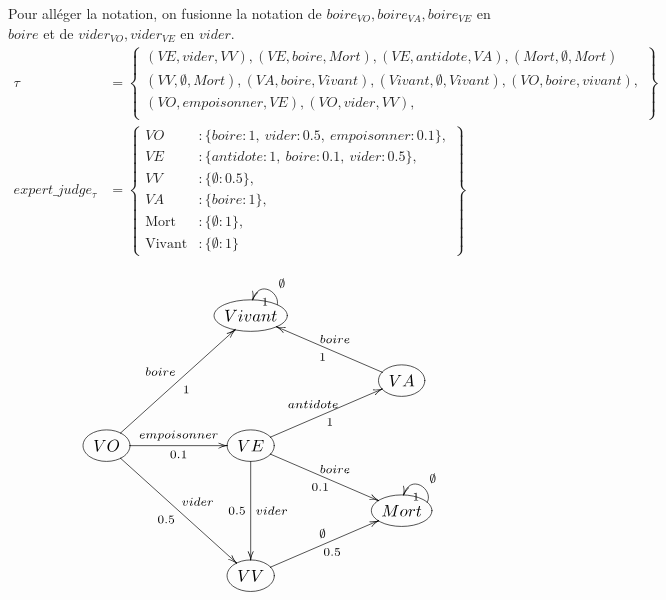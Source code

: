 Pour alléger la notation, on fusionne la notation de $boire_{VO},boire_{VA},boire_{VE}$ en $boire$ et de $vider_{VO}, vider_{VE}$ en $vider$.
\begin{equation*}
    \begin{aligned}
        \tau & = \left\{
        \begin{aligned}
        (VE,vider,VV),(VE,boire,Mort),(VE,antidote,VA),(Mort,\emptyset,Mort)\\
        (VV,\emptyset,Mort),(VA,boire,Vivant),(Vivant,\emptyset,Vivant),(VO, boire,vivant),\\
        (VO,empoisonner,VE),(VO,vider,VV),\\
        \end{aligned}
        \right\} \\
        expert\_judge_\tau &= \left\{
        \begin{aligned}
        VO &: \{boire: 1,\ vider: 0.5,\ empoisonner : 0.1\}, \\
        VE &: \{antidote: 1,\ boire: 0.1,\ vider: 0.5\}, \\
        VV &: \{\emptyset: 0.5\}, \\
        VA &: \{boire: 1\}, \\
        \text{Mort} &: \{\emptyset: 1\}, \\
        \text{Vivant} &: \{\emptyset: 1\}
        \end{aligned}
        \right\}
    \end{aligned}
\end{equation*}



\begin{align}
    \scalebox{1.2}{
        \xymatrix@=2em@C=5em{
            &    *++[o][F-]{Vivant} \ar @(r,u) []_{\emptyset}^1& \\
            &   &    *++[o][F-]{VA} \ar [lu]_{boire}^1  \\
            *++[o][F-]{VO}  \ar [ruu]^{boire}_1 \ar [r]^{empoisonner}_{0.1} \ar[rdd]^{vider}_{0.5} &*++[o][F-]{VE} \ar[ru]^{antidote}_1 \ar[rd]^{boire}_{0.1} \ar[dd]^{vider}_{0.5}&  \\
            &    & *++[o][F-]{Mort} \ar @(r,u) []_{\emptyset}^1 \\
             &     *++[o][F-]{VV} \ar [ru]^{\emptyset}_{0.5} &  \\
        }
    }
\end{align}


